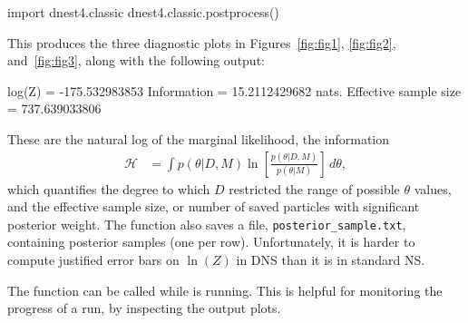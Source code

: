 \documentclass[article]{jss}
\begin{document}
\begin{CodeChunk}
\begin{CodeInput}
import dnest4.classic
dnest4.classic.postprocess()
\end{CodeInput}
\end{CodeChunk}
This produces the three diagnostic plots in Figures~\ref{fig:fig1},
\ref{fig:fig2}, and~\ref{fig:fig3}, along with the following output:
\begin{CodeChunk}
\begin{CodeOutput}
log(Z) = -175.532983853
Information = 15.2112429682 nats.
Effective sample size = 737.639033806
\end{CodeOutput}
\end{CodeChunk}
These are the natural log of the marginal likelihood, the
information
\begin{align}
\mathcal{H} &= \int p(\theta|D, M)
\ln\left[\frac{p(\theta | D, M)}{p(\theta | M)}\right] \, d\theta,
\end{align}
which quantifies the degree to which $D$ restricted the
range of possible $\theta$ values,
and the effective sample size,
or number of saved particles with significant posterior weight.
The  function also saves a file,
{\tt posterior\_sample.txt}, containing posterior samples (one per row).
Unfortunately, it is harder to compute justified error bars on $\ln(Z)$
in DNS than it is in standard NS.

The  function can be called while  is running.
This is helpful for monitoring the progress of a run, by inspecting the
output plots.
\end{document}
